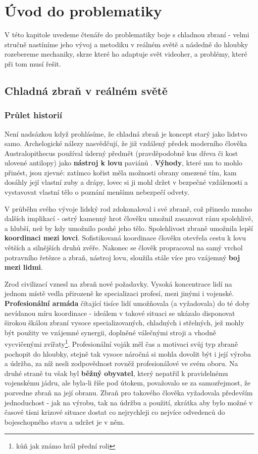 \chapter{Úvod do problematiky}
V této kapitole uvedeme čtenáře do problematiky boje s chladnou zbraní - velmi stručně nastíníme jeho vývoj a metodiku v reálném světě a následně do hloubky rozebereme mechaniky, skrze které ho adaptuje svět videoher, a problémy, které při tom musí řešit.


\section{Chladná zbraň v reálném světě}
\subsection{Průlet historií}

Není nadsázkou když prohlásíme, že chladná zbraň je koncept starý jako lidstvo samo. Archelogické nálezy nasvědčují, že již vzdálený předek moderního člověka Australopithecus používal úderný předmět (pravděpodobně kus dřeva či kost ulovené antilopy) jako \textbf{nástroj k lovu} paviánů \cite{AustralopithecusWeapon}. \textbf{Výhody}, které mu to mohlo přinést, jsou zjevné: zatímco kořist měla možnosti obrany omezené tím, kam dosáhly její vlastní zuby a drápy, lovec si ji mohl držet v bezpečné vzdálenosti a vystavovat vlastní tělo o poznání menšímu nebezpečí odvety.

V průběhu svého vývoje lidský rod zdokonaloval i své zbraně, což přineslo mnoho dalších implikací - ostrý kamenný hrot člověku umožnil zasazovat ránu spolehlivě, a hlubší, než by kdy umožnilo pouhé jeho tělo. Spolehlivost zbraně umožnila lepší \textbf{koordinaci mezi lovci}. Sofistikovaná koordinace člověku otevřela cestu k lovu větších a silnějších druhů zvěře. Nakonec se člověk propracoval na samý vrchol potravního řetězce a zbraň, nástroj lovu, sloužila stále více pro vzájemný \textbf{boj mezi lidmi}. 

Zrod civilizací vznesl na zbraň nové požadavky. Vysoká koncentrace lidí na jednom místě vedla přirozeně ke specializaci profesí, mezi jinými i vojenské. \textbf{Profesionální armáda} čítající tisíce lidí umožňovala (a vyžadovala) do té doby nevídanou míru koordinace - ideálem v takové situaci se ukázalo disponovat širokou škálou zbraní vysoce specializovaných, chladných i střelných, jež mohly být použity ve vzájemné synergii, doplněné válečnými stroji a vhodně vycvičenými zvířaty\footnote{kůň jak známo hrál přední roli}. Profesionální voják měl čas a motivaci svůj typ zbraně pochopit do hloubky, stejně tak vysoce náročná si mohla dovolit být i její výroba a údržba, za níž nesli zodpovědnost rovněž profesionálové ve svém oboru. 
Na druhé straně tu však byl \textbf{běžný obyvatel}, který nepatřil k pravidelnému vojenskému jádru, ale byla-li říše pod útokem, považovalo se za samozřejmost, že pozvedne zbraň na její obranu. Zbraň pro takového člověka vyžadovala především jednoduchost - jak na výrobu, tak na údržbu a použití, zkrátka aby bylo možné v časové tísni krizové situace dostat co nejrychleji co nejvíce odvedenců do bojeschopného stavu a udržet je v něm.

